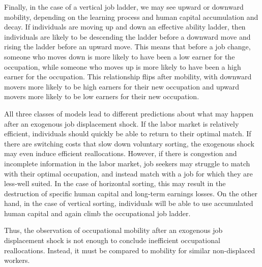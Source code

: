 \documentclass[12pt]{article}
\newcommand{\CiteReference}{../reference.bib}
\newcommand{\highlightPP}[1]{{\emph{\color{MyPurple}{#1}}}}
\theoremstyle{definition}
\begin{document}
Finally, in the case of a vertical job ladder, we may see upward or downward mobility, depending on the learning process and human capital accumulation and decay. If individuals are moving up and down an effective ability ladder, then individuals are likely to be descending the ladder before a downward move and rising the ladder before an upward move. This means that before a job change, someone who moves down is more likely to have been a low earner for the occupation, while someone who moves up is more likely to have been a high earner for the occupation. This relationship flips after mobility, with downward movers more likely to be high earners for their new occupation and upward movers more likely to be low earners for their new occupation. 

All three classes of models lead to different predictions about what may happen after an exogenous job displacement shock. If the labor market is relatively efficient, individuals should quickly be able to return to their optimal match. If there are switching costs that slow down voluntary sorting, the exogenous shock may even induce efficient reallocations. However, if there is congestion and incomplete information in the labor market, job seekers may struggle to match with their optimal occupation, and instead match with a job for which they are less-well suited. In the case of horizontal sorting, this may result in the destruction of specific human capital and long-term earnings losses. On the other hand, in the case of vertical sorting, individuals will be able to use accumulated human capital and again climb the occupational job ladder. 

Thus, the observation of occupational mobility after an exogenous job displacement shock is not enough to conclude inefficient occupational reallocations. Instead, it must be compared to mobility for similar non-displaced workers. \highlightPP{By measuring the frequency of upward and downward mobility, the prevalence of mobility within versus between firms, and the corresponding wage changes associated with different types of mobility, I will be able to distinguish between the theories of occupational mobility. }



 
\end{document}
